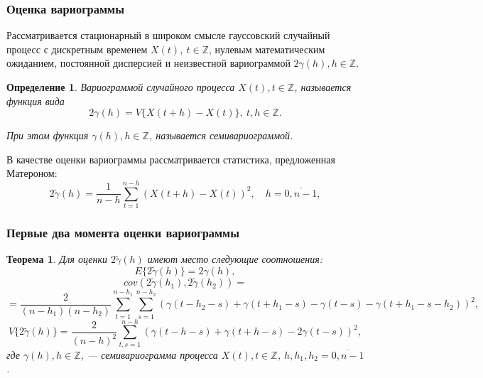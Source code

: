 \documentclass[10pt,pdf,aspectratio=169,hyperref={unicode}]{beamer}
\newtheorem{Definition}{Определение}
\newtheorem{Theorem}{Теорема}
\begin{document}
\begin{frame}
  \frametitle{Оценка вариограммы}
  Рассматривается стационарный в широком смысле гауссовский случайный процесс с дискретным временем $ X(t),~ t \in \mathbb{Z} $, нулевым математическим ожиданием, постоянной дисперсией и неизвестной вариограммой $ 2 \gamma(h), h \in \mathbb{Z} $.
  \begin{Definition}
    \textit{Вариограммой} случайного процесса $ X(t), t \in \mathbb{Z} $, называется функция вида
    \begin{equation}
    \label{eq:matheron}
        2 \gamma (h) = V \{ X(t + h) - X(t) \},~ t, h \in \mathbb{Z}.
    \end{equation}

    При этом функция $ \gamma (h), h \in \mathbb{Z} $, называется \textit{семивариограммой}.
  \end{Definition}
  В качестве оценки вариограммы рассматривается статистика, предложенная Матероном:
  \begin{equation}
    2 \tilde{\gamma}(h) = \frac{1}{n - h} \sum_{t = 1}^{n - h}(X(t + h) - X(t))^2, \quad h = \overline{0, n - 1},
  \end{equation}
\end{frame}

\begin{frame}
  \frametitle{Первые два момента оценки вариограммы}
\begin{Theorem}
  Для оценки $ 2 \tilde{\gamma}(h) $ имеют место следующие соотношения:
  \begin{equation*}
    E \{2 \tilde{\gamma}(h) \} = 2 \gamma(h), %
  \end{equation*}
  \begin{equation*}
    cov(2 \tilde{\gamma}(h_1), 2 \tilde{\gamma}(h_2)) =
  \end{equation*}
  \begin{equation*}
    = \frac{2}{(n - h_1)(n - h_2)} \sum_{t = 1}^{n - h_1}\sum_{s = 1}^{n - h_2} (\gamma(t - h_2 - s) + \gamma(t + h_1 - s) - \gamma(t - s) - \gamma(t + h_1 - s - h_2))^2,
  \end{equation*}
  \begin{equation*}
    V \{ 2 \tilde{\gamma}(h) \} = \frac{2}{(n-h)^2}\sum_{t,s = 1}^{n - h} ( \gamma(t - h - s) + \gamma(t + h - s) - 2\gamma(t - s) )^2,
  \end{equation*}
  где $ \gamma(h), h \in \mathbb{Z} $, --- семивариограмма процесса $ X(t), t \in \mathbb{Z}$, $ h, h_1, h_2 = \overline{0, n - 1} $.
\end{Theorem}
\end{frame}
\end{document}
